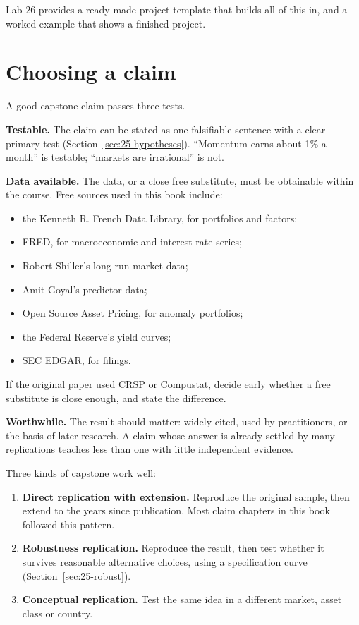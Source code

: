 Lab 26 provides a ready-made project template that builds all of this in, and a worked example that shows a finished project.

\section{Choosing a claim}
\label{sec:26-choosing}

A good capstone claim passes three tests.

\textbf{Testable.} The claim can be stated as one falsifiable sentence with a clear primary test (Section~\ref{sec:25-hypotheses}). ``Momentum earns about 1\% a month'' is testable; ``markets are irrational'' is not.

\textbf{Data available.} The data, or a close free substitute, must be obtainable within the course. Free sources used in this book include:

\begin{itemize}
  \item the Kenneth R. French Data Library, for portfolios and factors;
  \item FRED, for macroeconomic and interest-rate series;
  \item Robert Shiller's long-run market data;
  \item Amit Goyal's predictor data;
  \item Open Source Asset Pricing, for anomaly portfolios;
  \item the Federal Reserve's yield curves;
  \item SEC EDGAR, for filings.
\end{itemize}

If the original paper used CRSP or Compustat, decide early whether a free substitute is close enough, and state the difference.

\textbf{Worthwhile.} The result should matter: widely cited, used by practitioners, or the basis of later research. A claim whose answer is already settled by many replications teaches less than one with little independent evidence.

Three kinds of capstone work well:

\begin{enumerate}
  \item \textbf{Direct replication with extension.} Reproduce the original sample, then extend to the years since publication. Most claim chapters in this book followed this pattern.
  \item \textbf{Robustness replication.} Reproduce the result, then test whether it survives reasonable alternative choices, using a specification curve (Section~\ref{sec:25-robust}).
  \item \textbf{Conceptual replication.} Test the same idea in a different market, asset class or country.
\end{enumerate}

